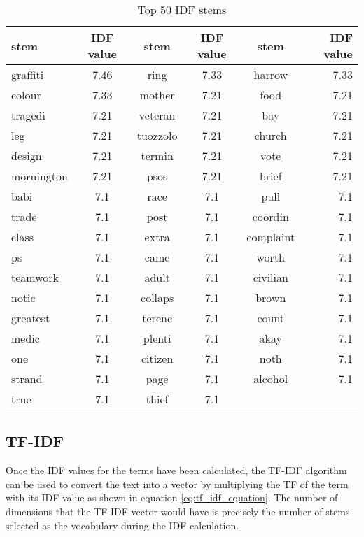 \begin{table}
\begin{center}
\caption{Top 50 IDF stems}
\label{tbl:idf_stems}
\begin{tabular}{lc|cc|cr|}
\toprule
stem&IDF value&stem&IDF value&stem&IDF value\\
\midrule
graffiti&7.46&ring&7.33&harrow&7.33\\ \hline 
colour&7.33&mother&7.21&food&7.21\\ \hline 
tragedi&7.21&veteran&7.21&bay&7.21\\ \hline 
leg&7.21&tuozzolo&7.21&church&7.21\\ \hline 
design&7.21&termin&7.21&vote&7.21\\ \hline 
mornington&7.21&psos&7.21&brief&7.21\\ \hline 
babi&7.1&race&7.1&pull&7.1\\ \hline 
trade&7.1&post&7.1&coordin&7.1\\ \hline 
class&7.1&extra&7.1&complaint&7.1\\ \hline 
ps&7.1&came&7.1&worth&7.1\\ \hline 
teamwork&7.1&adult&7.1&civilian&7.1\\ \hline 
notic&7.1&collaps&7.1&brown&7.1\\ \hline 
greatest&7.1&terenc&7.1&count&7.1\\ \hline 
medic&7.1&plenti&7.1&akay&7.1\\ \hline 
one&7.1&citizen&7.1&noth&7.1\\ \hline 
strand&7.1&page&7.1&alcohol&7.1\\ \hline 
true&7.1&thief&7.1&&\\
\bottomrule
\end{tabular}
\end{center}
\end{table}


\subsection{TF-IDF}
Once the IDF values for the terms have been calculated, the TF-IDF algorithm can be used to convert the text into a vector by multiplying the TF of the term with its IDF value as shown in equation \eqref{eq:tf_idf_equation}. The number of dimensions that the TF-IDF vector would have is precisely the number of stems selected as the vocabulary during the IDF calculation.

